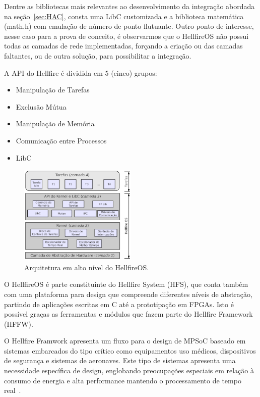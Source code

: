 Dentre as bibliotecas mais relevantes ao desenvolvimento da integração abordada na seção~\ref{sec:HAC},
consta uma LibC customizada e a biblioteca matemática (math.h) com emulação de número de ponto
flutuante. Outro ponto de interesse, nesse caso para a prova de conceito, é observarmos
que o HellfireOS não possui todas as camadas de rede implementadas, forçando a criação
ou das camadas faltantes, ou de outra solução, para possibilitar a integração.

A API do Hellfire é dividida em 5 (cinco) grupos:

\begin{itemize}
\item Manipulação de Tarefas
\item Exclusão Mútua
\item Manipulação de Memória
\item Comunicação entre Processos
\item LibC
\end{itemize}


\begin{figure}[H]
	\centering
		\includegraphics[width=0.5\textwidth]{fig/HellfireArch.png}
	\caption{Arquitetura em alto nível do HellfireOS.}
\end{figure}


O HellfireOS é parte constituinte do Hellfire System (HFS), que conta também com uma
plataforma para design que compreende diferentes níveis de abstração, partindo de aplicações
escritas em C até a prototipação em FPGAs. Isto é possível graças as ferramentas e módulos
que fazem parte do Hellfire Framework (HFFW).

O Hellfire Framwork apresenta um fluxo para o design de MPSoC baseado em sistemas embarcados do tipo crítico
como equipamentos uso médicos, dispositivos de segurança e sistemas de aeronaves. Este tipo de sistemas
apresenta uma necessidade específica de design, englobando preocupações especiais em relação à consumo de
energia e alta performance mantendo o processamento de tempo real~\cite{5450495}.
